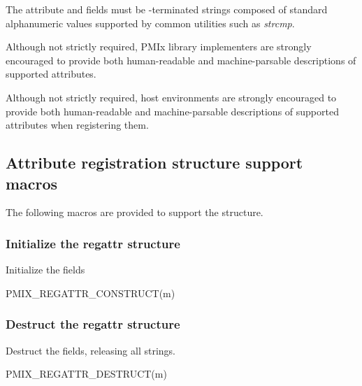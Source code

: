 The attribute  and  fields must be -terminated strings composed of standard alphanumeric values supported by common utilities such as \textit{strcmp}.

\adviceimplstart
Although not strictly required, \ac{PMIx} library implementers are strongly encouraged to provide both human-readable and machine-parsable descriptions of supported attributes.
\adviceimplend

\advicermstart
Although not strictly required, host environments are strongly encouraged to provide both human-readable and machine-parsable descriptions of supported attributes when registering them.
\advicermend


\subsection{Attribute registration structure support macros}
The following macros are provided to support the  structure.

\subsubsection{Initialize the regattr structure}

Initialize the  fields

\cspecificstart
\begin{codepar}
PMIX_REGATTR_CONSTRUCT(m)
\end{codepar}
\cspecificend

\begin{arglist}
\end{arglist}

\subsubsection{Destruct the regattr structure}

Destruct the  fields, releasing all strings.

\cspecificstart
\begin{codepar}
PMIX_REGATTR_DESTRUCT(m)
\end{codepar}
\cspecificend

\begin{arglist}
\end{arglist}

